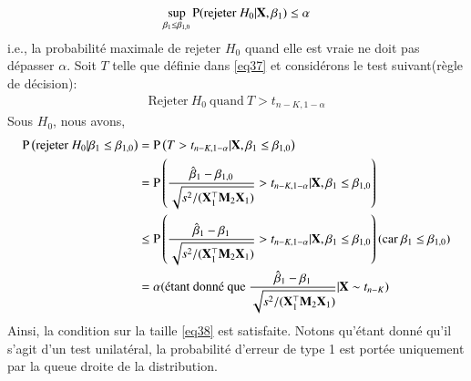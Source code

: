 \documentclass[10pt, reqno]{amsart}
\begin{document}
\begin{align}
\underset{\beta_1\leq\beta_{1,0}}{\sup}\operatorname{P}(\textrm{rejeter} \ H_0 | \mathbf X, \beta_1) \leq \alpha
\label{eq38}
\end{align}
i.e., la probabilité maximale de rejeter $H_0$ quand elle est vraie ne doit pas dépasser $\alpha$. Soit $T$ telle que définie dans \eqref{eq37} et considérons le test suivant(règle de décision):
\begin{align*}
\textrm{Rejeter}  \ H_0 \ \textrm{quand}  \ T > t_{n-K, 1-\alpha}
\end{align*}
Sous $H_0$, nous avons,
\begin{align*}
\operatorname{P}\left(\textrm{rejeter} \ H_0 | \beta_1 \leq \beta_{1,0}  \right)&=\operatorname{P}\left(T >  t_{n-K, 1-\alpha} | \mathbf X, \beta_1 \leq \beta_{1,0}\right)\\
&=\operatorname{P}\left( 
\frac{\hat{\beta}_1 - \beta_{1,0}}{\sqrt{s^2/(\mathbf X_1^\top\mathbf M_2\mathbf X_1)}} >  t_{n-K, 1-\alpha} | \mathbf X, \beta_1 \leq \beta_{1,0}\right)\\
&\leq
\operatorname{P}\left( 
\frac{\hat{\beta}_1 - \beta_1}{\sqrt{s^2/(\mathbf X_1^\top\mathbf M_2\mathbf X_1)}} >  t_{n-K, 1-\alpha} | \mathbf X, \beta_1 \leq \beta_{1,0}\right)(\textrm{car}  \  \beta_1 \leq \beta_{1,0})\\
&=\alpha( \textrm{étant donné que} \  \frac{\hat{\beta}_1 - \beta_1}{\sqrt{s^2/(\mathbf X_1^\top\mathbf M_2\mathbf X_1)}} | \mathbf X \sim t_{n-K}  )
\end{align*}
Ainsi, la condition sur la taille \eqref{eq38} est satisfaite. Notons qu'étant donné qu'il s'agit d'un test unilatéral, la probabilité d'erreur de type 1 est portée uniquement par la queue droite de la distribution.
\end{document}
